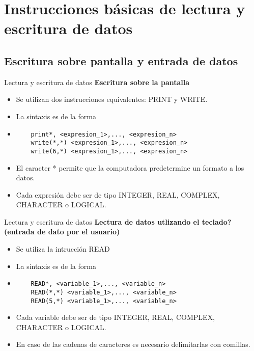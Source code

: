 
\section{Instrucciones básicas de lectura y escritura de datos}  


\subsection{Escritura sobre pantalla y entrada de datos}

\begin{frame}[fragile]{Lectura y escritura de datos}
\textbf{Escritura sobre la pantalla}
 \begin{itemize}[<+(1)->]
  \item Se utilizan dos instrucciones equivalentes: PRINT y WRITE.
  \item La sintaxis es de la forma 
  \item []
   \begin{verbatim}
    print*, <expresion_1>,..., <expresion_n>
    write(*,*) <expresion_1>,..., <expresion_n>
    write(6,*) <expresion_1>,..., <expresion_n>
   \end{verbatim}
  \item El caracter * permite que la computadora predetermine un formato a los datos.
  \item Cada expresión debe ser de tipo INTEGER, REAL, COMPLEX, CHARACTER o LOGICAL.
 \end{itemize}
\end{frame}

\begin{frame}[fragile]{Lectura y escritura de datos}
 \textbf{Lectura de datos utlizando el teclado? (entrada de dato por el usuario) }
 \begin{itemize}[<+(1)->]
  \item Se utiliza la intrucción READ
  \item La sintaxis es de la forma
  \vspace{0.2cm}
  \item []
   \begin{verbatim}
    READ*, <variable_1>,..., <variable_n>
    READ(*,*) <variable_1>,..., <variable_n>
    READ(5,*) <variable_1>,..., <variable_n>
   \end{verbatim}
  \item Cada variable debe ser de tipo INTEGER, REAL, COMPLEX, CHARACTER o LOGICAL. 
  \item En caso de las cadenas de caracteres es necesario delimitarlas con comillas.
 \end{itemize}
\end{frame}


